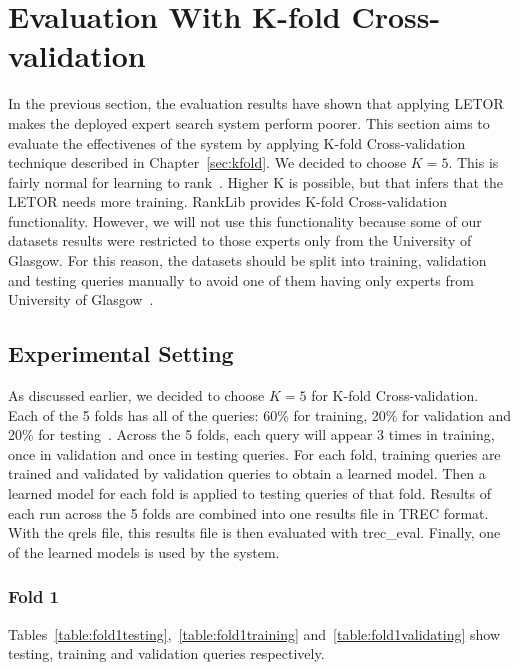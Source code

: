 \section{Evaluation With K-fold Cross-validation}
In the previous section, the evaluation results have shown that applying LETOR makes the deployed expert search system perform poorer. 
This section aims to evaluate the effectivenes of the system by applying K-fold Cross-validation
technique described in Chapter~\ref{sec:kfold}. We decided to choose $K = 5$. This is fairly normal for learning to rank~\cite{craig}.
Higher K is possible, but that infers that the LETOR needs more training. RankLib provides K-fold Cross-validation functionality. However, we will not
use this functionality because some of our datasets results were restricted to those experts only from the University of Glasgow. For this reason, the datasets should
be split into training, validation and testing queries manually to avoid one of them having only experts from University of Glasgow~\cite{craig}.

\subsection{Experimental Setting}

As discussed earlier, we decided to choose $K = 5$ for K-fold Cross-validation. Each of the 5 folds has all of the queries: 60\% for training, 
20\% for validation and 20\% for testing~\cite{kfoldcv}. Across the 5 folds, each query will appear 3 times in training, once in validation and 
once in testing queries. For each fold, training queries are trained and validated by validation queries to obtain a learned model.
Then a learned model for each fold is applied to testing queries of that fold. Results of each run across the 5 folds are combined into one results file in
TREC format. With the qrels file, this results file is then evaluated with trec\_eval. Finally, one of the learned models is used by the system.

\subsubsection{Fold 1}
Tables~\ref{table:fold1testing},~\ref{table:fold1training} and~\ref{table:fold1validating} show testing, training and validation queries respectively.


